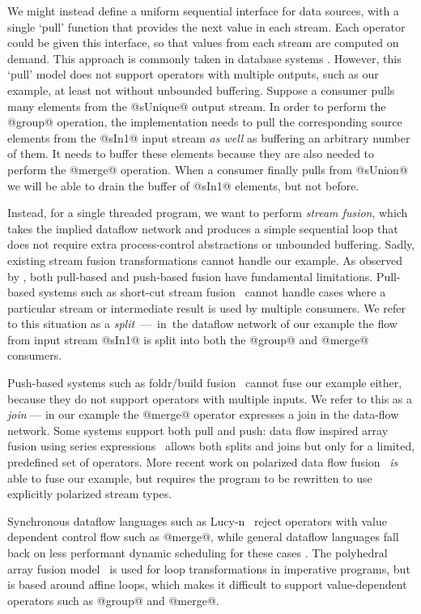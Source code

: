 We might instead define a uniform sequential interface for data sources, with a single `pull' function that provides the next value in each stream. Each operator could be given this interface, so that values from each stream are computed on demand. This approach is commonly taken in database systems \cite{Graefe:Volcano}. However, this `pull' model does not support operators with multiple outputs, such as our example, at least not without unbounded buffering. Suppose a consumer pulls many elements from the @sUnique@ output stream. In order to perform the @group@ operation, the implementation needs to pull the corresponding source elements from the @sIn1@ input stream \emph{as well} as buffering an arbitrary number of them. It needs to buffer these elements because they are also needed to perform the @merge@ operation. When a consumer finally pulls from @sUnion@ we will be able to drain the buffer of @sIn1@ elements, but not before.

Instead, for a single threaded program, we want to perform \emph{stream fusion}, which takes the implied dataflow network and produces a simple sequential loop that does not require extra process-control abstractions or unbounded buffering. Sadly, existing stream fusion transformations cannot handle our example. As observed by \citet{kay2009you}, both pull-based and push-based fusion have fundamental limitations. Pull-based systems such as short-cut stream fusion~\cite{coutts2007stream} cannot handle cases where a particular stream or intermediate result is used by multiple consumers. We refer to this situation as a \mbox{\emph{split} --- in the} dataflow network of our example the flow from input stream @sIn1@ is split into both the @group@ and @merge@ consumers. 

Push-based systems such as foldr/build fusion~\cite{gill1993short} cannot fuse our example either, because they do not support operators with multiple inputs. We refer to this as a \emph{join} --- in our example the @merge@ operator expresses a join in the data-flow network. Some systems support both pull and push: data flow inspired array fusion using series expressions~\cite{lippmeier2013data} allows both splits and joins but only for a limited, predefined set of operators. More recent work on polarized data flow fusion~\cite{lippmeier2016polarized} \emph{is} able to fuse our example, but requires the program to be rewritten to use explicitly polarized stream types. 

Synchronous dataflow languages such as Lucy-n~\cite{mandel2010lucy} reject operators with value dependent control flow such as @merge@, while general dataflow languages fall back on less performant dynamic scheduling for these cases \cite{bouakaz2013real}.
The polyhedral array fusion model~\cite{feautrier2011polyhedron} is used for loop transformations in imperative programs, but is based around affine loops, which makes it difficult to support value-dependent operators  such as @group@ and @merge@.

